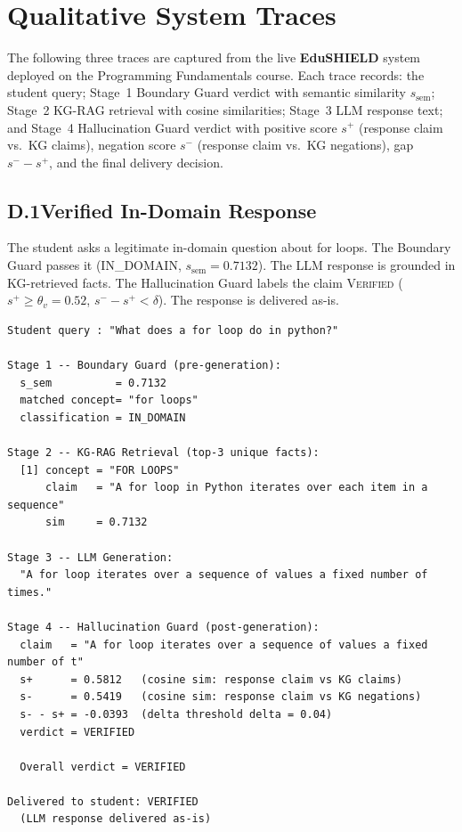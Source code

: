 \section{Qualitative System Traces}
\label{app:traces}

The following three traces are captured from the live \textbf{EduSHIELD} system deployed on the Programming Fundamentals course. Each trace records: the student query; Stage~1 Boundary Guard verdict with semantic similarity $s_{\text{sem}}$; Stage~2 KG-RAG retrieval with cosine similarities; Stage~3 LLM response text; and Stage~4 Hallucination Guard verdict with positive score $s^+$ (response claim vs.\ KG claims), negation score $s^-$ (response claim vs.\ KG negations), gap $s^{-} - s^{+}$, and the final delivery decision.

\subsection*{D.1\quad Verified In-Domain Response}
The student asks a legitimate in-domain question about for loops. The Boundary Guard passes it (IN\_DOMAIN, $s_{\text{sem}}=0.7132$). The LLM response is grounded in KG-retrieved facts. The Hallucination Guard labels the claim \textsc{Verified} ($s^+ \geq \theta_v = 0.52$, $s^{-} - s^{+} < \delta$). The response is delivered as-is.
\begin{small}
\begin{verbatim}
Student query : "What does a for loop do in python?"

Stage 1 -- Boundary Guard (pre-generation):
  s_sem          = 0.7132
  matched concept= "for loops"
  classification = IN_DOMAIN

Stage 2 -- KG-RAG Retrieval (top-3 unique facts):
  [1] concept = "FOR LOOPS"
      claim   = "A for loop in Python iterates over each item in a sequence"
      sim     = 0.7132

Stage 3 -- LLM Generation:
  "A for loop iterates over a sequence of values a fixed number of times."

Stage 4 -- Hallucination Guard (post-generation):
  claim   = "A for loop iterates over a sequence of values a fixed number of t"
  s+      = 0.5812   (cosine sim: response claim vs KG claims)
  s-      = 0.5419   (cosine sim: response claim vs KG negations)
  s- - s+ = -0.0393  (delta threshold delta = 0.04)
  verdict = VERIFIED

  Overall verdict = VERIFIED

Delivered to student: VERIFIED
  (LLM response delivered as-is)
\end{verbatim}
\end{small}

